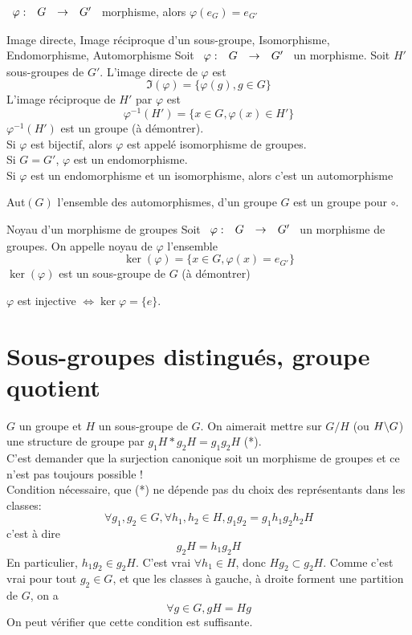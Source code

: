 \documentclass[]{report}
\begin{document}
\begin{re}{}{}
    $\begin{array}{ccccc} \varphi : & G & \to & G' \end{array}$ morphisme, alors $\varphi(e_G)=e_{G'}$
\end{re}

\begin{df}{Image directe, Image réciproque d'un sous-groupe, Isomorphisme, Endomorphisme, Automorphisme}{}
    Soit $\begin{array}{ccccc} \varphi : & G & \to & G' \end{array}$ un morphisme. Soit $H'$ sous-groupes de $G'$. L'image directe de $\varphi$ est
    \[\Im(\varphi)=\{\varphi(g),g\in G\}\]
    L'image réciproque de $H'$ par $\varphi$ est
    \[\varphi^{-1}(H')=\{x\in G, \varphi(x)\in H'\}\]
    $\varphi^{-1}(H')$ est un groupe (à démontrer).\\
    Si $\varphi$ est bijectif, alors $\varphi$ est appelé isomorphisme de groupes. \\
    Si $G=G'$, $\varphi$ est un endomorphisme. \\
    Si $\varphi$ est un endomorphisme et un isomorphisme, alors c'est un automorphisme
\end{df}

\begin{prop}{}{}
    Aut$(G)$ l'ensemble des automorphismes, d'un groupe $G$ est un groupe pour $\circ$.
\end{prop}

\begin{df}{Noyau d'un morphisme de groupes}{}
    Soit $\begin{array}{ccccc} \varphi : & G & \to & G' \end{array}$ un morphisme de groupes. On appelle noyau de $\varphi$ l'ensemble
    \[\ker (\varphi)=\{x\in G, \varphi(x)= e_{G'}\}\]
    $\ker (\varphi)$ est un sous-groupe de $G$ (à démontrer)
\end{df}

\begin{prop}{}{}
    $\varphi$ est injective $\iff \ker \varphi=\{e\}$.
\end{prop}

\section{Sous-groupes distingués, groupe quotient}

$G$ un groupe et $H$ un sous-groupe de $G$. On aimerait mettre sur $G/H$ (ou $H\backslash G$) une structure de groupe par $g_1 H*g_2 H=g_1 g_2 H$ (*).\\
C'est demander que la surjection canonique soit un morphisme de groupes et ce n'est pas toujours possible !\\
Condition nécessaire, que (*) ne dépende pas du choix des représentants dans les classes:
\[\forall g_1,g_2\in G,\forall h_1,h_2\in H, g_1 g_2=g_1 h_1 g_2 h_2 H\]
c'est à dire
\[g_2 H=h_1g_2 H\]
En particulier, $h_1 g_2\in g_2 H$. C'est vrai $\forall h_1\in H$, donc $Hg_2\subset g_2 H$. Comme c'est vrai pour tout $g_2\in G$, et que les classes à gauche, à droite forment une partition de $G$, on a
\[\forall g\in G ,gH=Hg\]
On peut vérifier que cette condition est suffisante.
\end{document}
